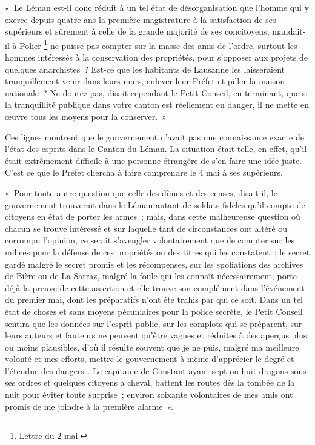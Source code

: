 \documentclass[french,twoside]{book} %
\newenvironment{quoteblock}%
  {\begin{quoting}}
  {\end{quoting}}
\newenvironment{quotebar}{%
    \def\FrameCommand{{\color{rubric!10!}\vrule width 0.5em} \hspace{0.9em}}%
    \def\OuterFrameSep{\itemsep} %
    \MakeFramed {\advance\hsize-\width \FrameRestore}
  }%
  {%
    \endMakeFramed
  }
\renewenvironment{quoteblock}%
  {%
    \savenotes
    \setstretch{0.9}
    \normalfont
    \begin{quotebar}
  }
  {%
    \end{quotebar}
    \spewnotes
  }
\begin{document}
\begin{quoteblock}
\noindent « Le Léman est-il donc réduit à un tel état de désorganisation que l’homme qui y exerce depuis quatre ans la première magistrature à là satisfaction de ses supérieurs et sûrement à celle de la grande majorité de ses concitoyens, mandait-il à Polier \footnote{Lettre du 2 mai.} ne puisse pas compter sur la masse des amis de l’ordre, surtout les hommes intéressés à la conservation des propriétés, pour s’opposer aux projets de quelques anarchistes ? Est-ce que les habitants de Lausanne les laisseraient tranquillement venir dans leurs murs, enlever leur Préfet et piller la maison nationale ? Ne doutez pas, disait cependant le Petit Conseil, en terminant, que si la tranquillité publique dans votre canton est réellement en danger, il ne mette en œuvre tous les moyens pour la conserver. »\end{quoteblock}

\noindent Ces lignes montrent que le gouvernement n’avait pas une connaissance exacte de l’état des esprits dans le Canton du Léman. La situation était telle, en effet, qu’il était extrêmement difficile à une personne étrangère de s’en faire une idée juste. C’est ce que le Préfet chercha à faire comprendre le 4 mai à ses supérieurs.\par

\begin{quoteblock}
 \noindent « Pour toute autre question que celle des dîmes et des censes, disait-il, le gouvernement trouverait dans le Léman autant de soldats fidèles qu’il compte de citoyens en état de porter les armes ; mais, dans cette malheureuse question où chacun se trouve intéressé et sur laquelle tant de circonstances ont altéré ou corrompu l’opinion, ce serait s’aveugler volontairement que de compter sur les milices pour la défense de ces propriétés ou des titres qui les constatent ; le secret gardé malgré le secret promis et les récompenses, sur les spoliations des archives de Bière ou de La Sarraz, malgré la foule qui les connaît nécessairement, porte déjà la preuve de cette assertion et elle trouve son complément dans l’événement du premier mai, dont les préparatifs n’ont été trahis par qui ce soit. Dans un tel état de choses et sans moyens pécuniaires pour la police secrète, le Petit Conseil sentira que les données sur l’esprit public, sur les complots qui se préparent, sur leurs auteurs et fauteurs ne peuvent qu’être vagues et réduites à des aperçus plus ou moins plausibles, d’où il résulte souvent que je ne puis, malgré ma meilleure volonté et mes efforts, mettre le gouvernement à même d’apprécier le degré et l’étendue des dangers… Le capitaine de Constant ayant sept ou huit dragons sous ses ordres et quelques citoyens à cheval, battent les routes dès la tombée de la nuit pour éviter toute surprise ; environ soixante volontaires de mes amis ont promis de me joindre à la première alarme ».
 \end{quoteblock}
\end{document}
